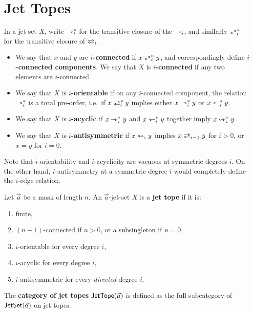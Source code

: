 \documentclass[a4paper]{memoir}
\begin{document}
\section{Jet Topes} \label{sec:jettope}
\begin{definition}
	\label{def:jet-connected}
	\label{def:jet-sublinear}
	In a jet set $X$, write $\rightarrowtriangle_i^*$ for the transitive closure of the $\rightarrowtriangle_i$, and similarly $\infrajet_i^*$ for the transitive closure of $\infrajet_i$.
	\begin{itemize}
		\item We say that $x$ and $y$ are \textbf{$i$-connected} if $x \infrajet_i^* y$, and correspondingly define \textbf{$i$-connected components}.
		We say that $X$ is \textbf{$i$-connected} if any two elements are $i$-connected.
		\item We say that $X$ is \textbf{$i$-orientable} if on any $i$-connected component, the relation ${\rightarrowtriangle}_i^*$ is a total pre-order, i.e.\ if $x \infrajet_i^* y$ implies either $x \rightarrowtriangle_i^* y$ or $x \leftarrowtriangle_i^* y$.
		\item We say that $X$ is \textbf{$i$-acyclic} if $x \rightarrowtriangle_i^* y$ and $x \leftarrowtriangle_i^* y$ together imply $x \leftrightarrowtriangle_i^* y$.
		\item We say that $X$ is \textbf{$i$-antisymmetric} if $x \leftrightarrowtriangle_i y$ implies $x \infrajet_{i-1} y$ for $i > 0$, or $x = y$ for $i = 0$.
	\end{itemize}
\end{definition}
Note that $i$-orientability and $i$-acyclicity are vacuous at symmetric degrees $i$.
On the other hand, $i$-antisymmetry at a symmetric degree $i$ would completely define the $i$-edge relation.
\begin{definition} \label{def:jet-tope}
	Let $\vec a$ be a mask of length $n$.
	An $\vec a$-jet-set $X$ is a \textbf{jet tope} if it is:
	\begin{enumerate}
		\item finite,
		\item $(n-1)$-connected if $n > 0$, or a subsingleton if $n = 0$,
		\item $i$-orientable for every degree $i$,
		\item $i$-acyclic for every degree $i$,
		\item $i$-antisymmetric for every \emph{directed} degree $i$.
	\end{enumerate}
	The \textbf{category of jet topes} $\mathsf{JetTope}(\vec a)$ is defined as the full subcategory of $\mathsf{JetSet}(\vec a)$ on jet topes.
\end{definition}
\end{document}
